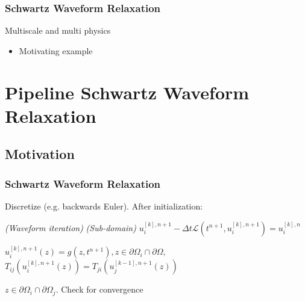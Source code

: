 \documentclass{beamer}
\begin{document}
\begin{frame}
  \frametitle{Schwartz Waveform Relaxation}
  \vspace*{-0.25in}

  Multiscale and multi physics
  \begin{itemize}
  \item Motivating example
  \end{itemize}

\end{frame}




\section{Pipeline Schwartz Waveform Relaxation}
\subsection{Motivation}
\begin{frame}
  \frametitle{Schwartz Waveform Relaxation}
  Discretize (e.g. backwards Euler). After initialization: 

  \begin{algorithmic}
    \textit{ (Waveform iteration)}
       \textit{ (Sub-domain)}
          \State $u_i^{[k],n+1} - \Delta t\mathcal{L}(t^{n+1},u_i^{[k],n+1}) = u_i^{[k],n}$

          \State $u_i^{[k],n+1}(z) = g(z,t^{n+1}), 
                z \in \partial\Omega_i\cap\partial\Omega,$
        \EndFor
          \State ${T}_{ij}(u_i^{[k],n+1}(z)) = 
                {T}_{ji}(u_j^{[k-1],n+1}(z))$

          \State  $z \in \partial\Omega_i\cap\partial\Omega_j.$
        \EndFor
        \State Check for convergence
      \EndParFor
    \EndFor
  \end{algorithmic}
  
\end{frame}
\end{document}
